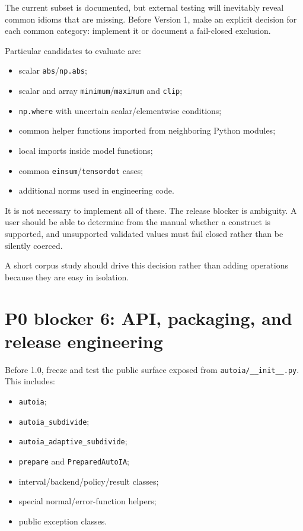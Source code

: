 \documentclass[11pt]{article}
\newcommand{\codepath}[1]{\nolinkurl{#1}}
\begin{document}
The current subset is documented, but external testing will inevitably reveal
common idioms that are missing.  Before Version 1, make an explicit decision for
each common category: implement it or document a fail-closed exclusion.

Particular candidates to evaluate are:
\begin{itemize}[leftmargin=*]
\item scalar \texttt{abs}/\texttt{np.abs};
\item scalar and array \texttt{minimum}/\texttt{maximum} and \texttt{clip};
\item \texttt{np.where} with uncertain scalar/elementwise conditions;
\item common helper functions imported from neighboring Python modules;
\item local imports inside model functions;
\item common \texttt{einsum}/\texttt{tensordot} cases;
\item additional norms used in engineering code.
\end{itemize}

It is not necessary to implement all of these.  The release blocker is ambiguity.
A user should be able to determine from the manual whether a construct is
supported, and unsupported validated values must fail closed rather than be
silently coerced.

A short corpus study should drive this decision rather than adding operations
because they are easy in isolation.

\section{P0 blocker 6: API, packaging, and release engineering}

Before 1.0, freeze and test the public surface exposed from
\codepath{autoia/__init__.py}.  This includes:
\begin{itemize}[leftmargin=*]
\item \texttt{autoia};
\item \texttt{autoia\_subdivide};
\item \texttt{autoia\_adaptive\_subdivide};
\item \texttt{prepare} and \texttt{PreparedAutoIA};
\item interval/backend/policy/result classes;
\item special normal/error-function helpers;
\item public exception classes.
\end{itemize}
\end{document}
